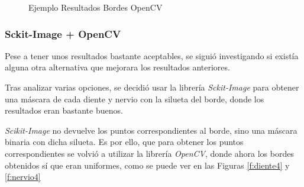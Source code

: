 \begin{figure}[h]
 \centering
 \caption{Ejemplo Resultados Bordes OpenCV}
 \label{f:cv2bordes}
\end{figure}

\subsubsection{Sckit-Image + OpenCV}
Pese a tener unos resultados bastante aceptables, se siguió investigando si existía alguna otra alternativa que mejorara los resultados anteriores. 

Tras analizar varias opciones, se decidió usar la librería \emph{Sckit-Image} para obtener una máscara de cada diente y nervio con la silueta del borde, donde los resultados eran bastante buenos.

\emph{Scikit-Image} no devuelve los puntos correspondientes al borde, sino una máscara binaria con dicha silueta. Es por ello, que para obtener los puntos correspondientes se volvió a utilizar la librería \emph{OpenCV}, donde ahora los bordes obtenidos sí que eran uniformes, como se puede ver en las Figuras \ref{f:diente4} y \ref{f:nervio4}

